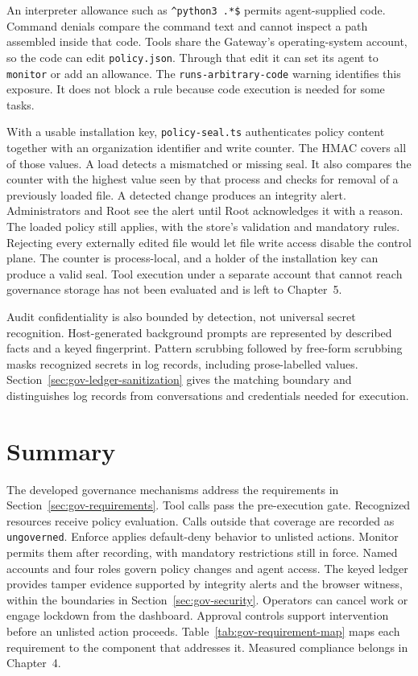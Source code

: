 {\color{red}An interpreter allowance such as
\texttt{\textasciicircum python3 .*\$} permits agent-supplied code.
Command denials compare the command text and cannot inspect a path assembled
inside that code. Tools share the Gateway's operating-system account, so the
code can edit \texttt{policy.json}. Through that edit it can set its agent to
\texttt{monitor} or add an allowance. The \texttt{runs-arbitrary-code} warning
identifies this exposure. It does not block a rule because code execution is
needed for some tasks.

With a usable installation key, \texttt{policy-seal.ts} authenticates policy
content together with an organization identifier and write counter. The HMAC
covers all of those values. A load detects a mismatched or missing seal.
It also compares the counter with the highest value seen by that process and
checks for removal of a previously loaded file. A detected change produces an
integrity alert.
Administrators and Root see the alert until Root acknowledges it with a
reason. The loaded policy still applies, with the store's validation and
mandatory rules. Rejecting every externally edited file would let file
write access disable the control plane. The counter is process-local, and a
holder of the installation key can produce a valid seal. Tool execution
under a separate account that cannot reach governance storage has not been
evaluated and is left to Chapter~5.

Audit confidentiality is also bounded by detection, not universal secret
recognition. Host-generated background prompts are represented by described
facts and a keyed fingerprint. Pattern scrubbing followed by free-form
scrubbing masks recognized secrets in log records, including prose-labelled
values. Section~\ref{sec:gov-ledger-sanitization} gives the matching boundary
and distinguishes log records from conversations and credentials needed for
execution.}

\FloatBarrier
\section{Summary}
\label{sec:gov-designsummary}

{\color{red}The developed governance mechanisms address the requirements in
Section~\ref{sec:gov-requirements}. Tool calls pass the pre-execution gate.
Recognized resources receive policy evaluation. Calls outside that coverage
are recorded as \texttt{ungoverned}. Enforce applies default-deny behavior to
unlisted actions. Monitor permits them after recording, with mandatory restrictions
still in force. Named accounts and four roles govern policy changes and
agent access. The keyed ledger provides tamper evidence supported by integrity
alerts and the browser witness, within the boundaries in
Section~\ref{sec:gov-security}. Operators can cancel work or engage lockdown
from the dashboard. Approval controls support intervention before an unlisted
action proceeds. Table~\ref{tab:gov-requirement-map} maps each requirement
to the component that addresses it. Measured compliance belongs in Chapter~4.}

